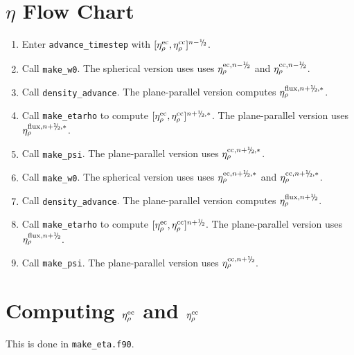 \section{$\eta$ Flow Chart}
\begin{enumerate}
\item Enter {\tt advance\_timestep} with $[\etarhoec, \etarhocc]^{n-\myhalf}$.
\item Call {\tt make\_w0}.  The spherical version uses uses $\etarho^{{\rm ec},n-\myhalf}$ and $\etarho^{{\rm cc},n-\myhalf}$.
\item Call {\tt density\_advance}.  The plane-parallel version computes $\etarho^{{\rm flux},n+\myhalf,*}$.
\item Call {\tt make\_etarho} to compute $[\etarhoec, \etarhocc]^{n+\myhalf,*}$.  The plane-parallel version uses $\etarho^{{\rm flux},n+\myhalf,*}$.
\item Call {\tt make\_psi}.  The plane-parallel version uses $\etarho^{{\rm cc},n+\myhalf,*}$.
\item Call {\tt make\_w0}.  The spherical version uses uses $\etarho^{{\rm ec},n+\myhalf,*}$ and $\etarho^{{\rm cc},n+\myhalf,*}$.
\item Call {\tt density\_advance}.  The plane-parallel version computes $\etarho^{{\rm flux},n+\myhalf}$.
\item Call {\tt make\_etarho} to compute $[\etarhoec, \etarhocc]^{n+\myhalf}$.  The plane-parallel version uses $\etarho^{{\rm flux},n+\myhalf}$.
\item Call {\tt make\_psi}.  The plane-parallel version uses $\etarho^{{\rm cc},n+\myhalf}$.
\end{enumerate}

\section{Computing $\eta_{\rho}^{\rm ec}$ and $\eta_{\rho}^{\rm cc}$}
This is done in {\tt make\_eta.f90}.

